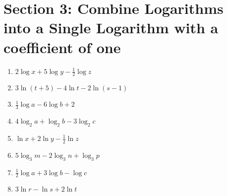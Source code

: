 \documentclass{hw}
\begin{document}
\section*{\normalsize Section 3: Combine Logarithms into a Single Logarithm with a coefficient of one}
\begin{enumerate}[label=\alph*.]
    \item $ 2 \log x + 5 \log y - \frac{1}{2} \log z $
        \studentlargeworkspace
    \item $ 3 \ln (t + 5) - 4 \ln t - 2 \ln (s - 1) $
        \studentlargeworkspace
    \item $ \frac{1}{3} \log a - 6 \log b + 2 $
        \studentlargeworkspace
    \item $ 4 \log_2 a + \log_2 b - 3 \log_2 c $
        \studentlargeworkspace
    \item $ \ln x + 2 \ln y - \frac{1}{2} \ln z $
        \studentlargeworkspace
    \item $ 5 \log_3 m - 2 \log_3 n + \log_3 p $
        \studentlargeworkspace
    \item $ \frac{1}{2} \log a + 3 \log b - \log c $
        \studentlargeworkspace
    \item $ 3 \ln r - \ln s + 2 \ln t $
        \studentlargeworkspace
\end{enumerate}
\end{document}
